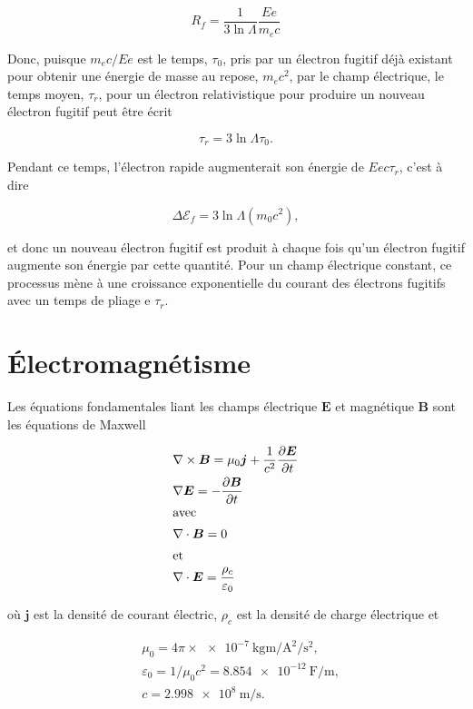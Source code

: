 \documentclass[main.tex]{subfiles}
\begin{document}
\[
	R_f = \frac{1}{3 \ln \Lambda}\frac{E e}{m_e c}
\]

\noindent Donc, puisque \( m_e c / Ee \) est le temps, \( \tau_0 \), pris par un électron fugitif déjà existant pour obtenir une énergie de masse au repose, \( m_e c^2 \), par le champ électrique, le temps moyen, \( \tau_r \), pour un électron relativistique pour produire un nouveau électron fugitif peut être écrit

\[
	\tau_r = 3 \ln \Lambda \tau_0.
\]

\noindent Pendant ce temps, l'électron rapide augmenterait son énergie de \( E e c \tau_r \), c'est à dire

\[
	\Delta \mathcal{E}_f = 3 \ln \Lambda \left( m_0 c^2 \right),
\]

\noindent et donc un nouveau électron fugitif est produit à chaque fois qu'un électron fugitif augmente son énergie par cette quantité.
Pour un champ électrique constant, ce processus mène à une croissance exponentielle du courant des électrons fugitifs avec un temps de pliage e \( \tau_r \).

\section{Électromagnétisme}
\label{sec:electromagnetisme}

Les équations fondamentales liant les champs électrique \( \bm{E} \) et magnétique \( \bm{B} \) sont les équations de Maxwell

\begin{align}
	&\nabla \times \bm{B} = \mu_0 \bm{j} + \frac{1}{c^2} \frac{\partial \bm{E}}{\partial t} \label{eq:Maxwell1}\\
	&\nabla \bm{E} = - \frac{\partial \bm{B}}{\partial t} \label{eq:Maxwell2}\\
	\intertext{avec}
	&\nabla \cdot \bm{B} = 0 \label{eq:Maxwell3}\\
	\intertext{et}
	&\nabla \cdot \bm{E} = \frac{\rho_c}{\varepsilon_0} \label{eq:Maxwell4}
\end{align}

\noindent où \( \bm{j} \) est la densité de courant électric, \( \rho_c \) est la densité de charge électrique et

\begin{align*}
	&\mu_0 = 4\pi \times \SI{e-7}{\kilogram\meter\per\ampere\squared\per\second\squared},\\
	&\varepsilon_0 = 1/\mu_0c^2 = \SI{8.854e-12}{\farad\per\meter},\\
	&c = \SI{2.998e8}{\meter\per\second}.
\end{align*}
\end{document}
